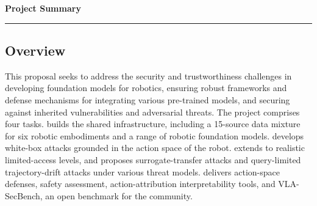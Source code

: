 {\Large\bfseries\filcenter
Project Summary
\\\rule{\textwidth}{0.4pt}}



\subsection*{Overview}

This proposal seeks to address the security and trustworthiness challenges in
developing foundation models for robotics, ensuring robust frameworks and defense mechanisms for
integrating various pre-trained models, and securing against inherited vulnerabilities and adversarial
threats.
The project comprises four tasks.  builds the shared infrastructure, including a 15-source data mixture for six robotic embodiments and a range of robotic foundation models.  develops white-box attacks grounded in the action space of the robot.  extends to realistic limited-access levels, and proposes surrogate-transfer attacks and query-limited trajectory-drift attacks under various threat models.  delivers action-space defenses, safety assessment, action-attribution interpretability tools, and VLA-SecBench, an open benchmark for the community.






